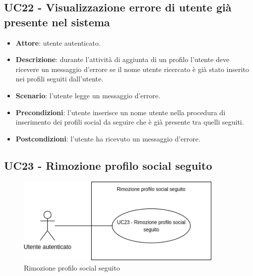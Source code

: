 \subsection{UC22 - Visualizzazione errore di utente già presente nel sistema}
\begin{itemize}
    \item \textbf{Attore}: utente autenticato.
    \item \textbf{Descrizione}: durante l'attività di aggiunta di un profilo l'utente deve ricevere un messaggio d'errore se il nome utente ricercato è già stato inserito nei profili seguiti dall'utente.
    \item \textbf{Scenario}: l'utente legge un messaggio d'errore. 
    \item \textbf{Precondizioni}: l'utente inserisce un nome utente nella procedura di inserimento dei profili social da seguire che è già presente tra quelli seguiti.
    \item \textbf{Postcondizioni}: l'utente ha ricevuto un messaggio d'errore.
\end{itemize}

\subsection{UC23 - Rimozione profilo social seguito}

\begin{figure}[!h]
    \includegraphics[width=10cm]{sezioni/Images/UC23.png}
    \centering
    \caption{Rimozione profilo social seguito}
\end{figure}

